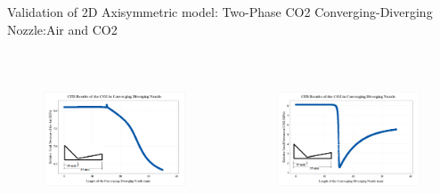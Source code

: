 \begin{frame}{Validation of 2D Axisymmetric model: Two-Phase CO2 Converging-Diverging Nozzle:Air and CO2}
 \begin{columns}
    \begin{figure}
        \centering
        \includegraphics[height=4.5cm]{images/cdnrelativepress1.png}
    \end{figure}
  \begin{figure}
        \centering
        \includegraphics[height=4.5cm]{images/cdnrelativepress2.png}
    \end{figure}
 \end{columns}
\end{frame}

